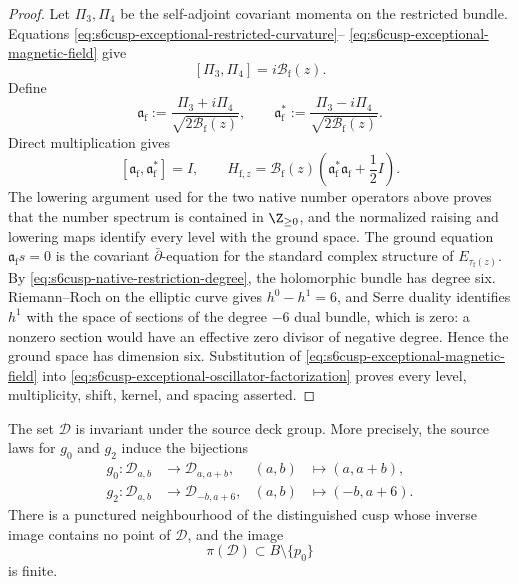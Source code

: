 \begin{proof}
Let \(\Pi_3,\Pi_4\) be the self-adjoint covariant momenta on the restricted
bundle.  Equations \eqref{eq:s6cusp-exceptional-restricted-curvature}--
\eqref{eq:s6cusp-exceptional-magnetic-field} give
\begin{equation}\label{eq:s6cusp-exceptional-momentum-commutator}
 [\Pi_3,\Pi_4]=i\mathcal B_{\mathrm f}(z).
\end{equation}
Define
\begin{equation}\label{eq:s6cusp-exceptional-ladder}
 \mathfrak a_{\mathrm f}
 :=\frac{\Pi_3+i\Pi_4}{\sqrt{2\mathcal B_{\mathrm f}(z)}},
 \qquad
 \mathfrak a_{\mathrm f}^*
 :=\frac{\Pi_3-i\Pi_4}{\sqrt{2\mathcal B_{\mathrm f}(z)}}.
\end{equation}
Direct multiplication gives
\begin{equation}\label{eq:s6cusp-exceptional-oscillator-factorization}
 [\mathfrak a_{\mathrm f},\mathfrak a_{\mathrm f}^*]=I,
 \qquad
 H_{\mathrm f,z}
 =\mathcal B_{\mathrm f}(z)
 \left(\mathfrak a_{\mathrm f}^*\mathfrak a_{\mathrm f}
 +\frac12I\right).
\end{equation}
The lowering argument used for the two native number operators above proves
that the number spectrum is contained in \(\Z_{\ge0}\), and the normalized
raising and lowering maps identify every level with the ground space.  The
ground equation \(\mathfrak a_{\mathrm f}s=0\) is the covariant
\(\bar\partial\)-equation for the standard complex structure of
\(E_{\tau_{\mathrm f}(z)}\).  By
\eqref{eq:s6cusp-native-restriction-degree}, the holomorphic bundle has
degree six.  Riemann--Roch on the elliptic curve gives
\(h^0-h^1=6\), and Serre duality identifies \(h^1\) with the space of
sections of the degree \(-6\) dual bundle, which is zero: a nonzero section
would have an effective zero divisor of negative degree.  Hence the ground
space has dimension six.  Substitution of
\eqref{eq:s6cusp-exceptional-magnetic-field} into
\eqref{eq:s6cusp-exceptional-oscillator-factorization} proves every level,
multiplicity, shift, kernel, and spacing asserted.
\end{proof}

\begin{theorem}
\label{thm:s6cusp-descent-locus-finite}
The set \(\mathscr D\) is invariant under the source deck group.  More
precisely, the source laws for \(g_0\) and \(g_2\) induce the bijections
\begin{align}
 g_0:\mathscr D_{a,b}&\longrightarrow\mathscr D_{a,a+b},
 & (a,b)&\longmapsto(a,a+b),
 \label{eq:s6cusp-descent-pair-g0}\\
 g_2:\mathscr D_{a,b}&\longrightarrow\mathscr D_{-b,a+6},
 & (a,b)&\longmapsto(-b,a+6).
 \label{eq:s6cusp-descent-pair-g2}
\end{align}
There is a punctured neighbourhood of the distinguished cusp whose inverse
image contains no point of \(\mathscr D\), and the image
\begin{equation}\label{eq:s6cusp-descent-finite-image}
 \pi(\mathscr D)\subset B\setminus\{p_0\}
\end{equation}
is finite.
\end{theorem}

